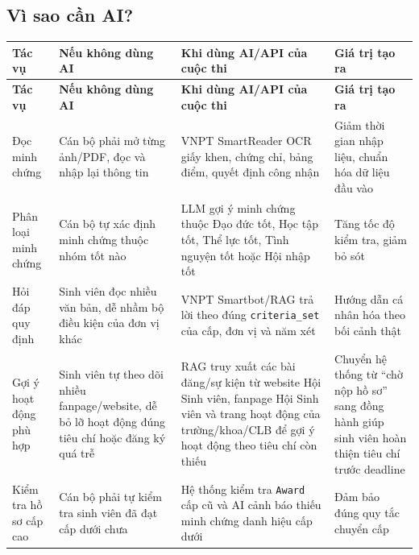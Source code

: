 \subsection{Vì sao cần AI?}

\begingroup
\footnotesize
\setlength{\tabcolsep}{3pt}
\renewcommand{\arraystretch}{1.25}

\begin{longtable}{|>{\raggedright\arraybackslash}p{}|
                  >{\raggedright\arraybackslash}p{}|
                  >{\raggedright\arraybackslash}p{}|
                  >{\raggedright\arraybackslash}p{}|}
\hline
\textbf{Tác vụ} &
\textbf{Nếu không dùng AI} &
\textbf{Khi dùng AI/API của cuộc thi} &
\textbf{Giá trị tạo ra} \\ \hline
\endfirsthead

\hline
\textbf{Tác vụ} &
\textbf{Nếu không dùng AI} &
\textbf{Khi dùng AI/API của cuộc thi} &
\textbf{Giá trị tạo ra} \\ \hline
\endhead

Đọc minh chứng &
Cán bộ phải mở từng ảnh/PDF, đọc và nhập lại thông tin &
VNPT SmartReader OCR giấy khen, chứng chỉ, bảng điểm, quyết định công nhận &
Giảm thời gian nhập liệu, chuẩn hóa dữ liệu đầu vào \\ \hline

Phân loại minh chứng &
Cán bộ tự xác định minh chứng thuộc nhóm tốt nào &
LLM gợi ý minh chứng thuộc Đạo đức tốt, Học tập tốt, Thể lực tốt, Tình nguyện tốt hoặc Hội nhập tốt &
Tăng tốc độ kiểm tra, giảm bỏ sót \\ \hline

Hỏi đáp quy định &
Sinh viên đọc nhiều văn bản, dễ nhầm bộ điều kiện của đơn vị khác &
VNPT Smartbot/RAG trả lời theo đúng \texttt{criteria\_set} của cấp, đơn vị và năm xét &
Hướng dẫn cá nhân hóa theo bối cảnh thật \\ \hline

Gợi ý hoạt động phù hợp &
Sinh viên tự theo dõi nhiều fanpage/website, dễ bỏ lỡ hoạt động đúng tiêu chí hoặc đăng ký quá trễ &
RAG truy xuất các bài đăng/sự kiện từ website Hội Sinh viên, fanpage Hội Sinh viên và trang hoạt động của trường/khoa/CLB để gợi ý hoạt động theo tiêu chí còn thiếu &
Chuyển hệ thống từ ``chờ nộp hồ sơ'' sang đồng hành giúp sinh viên hoàn thiện tiêu chí trước deadline \\ \hline

Kiểm tra hồ sơ cấp cao &
Cán bộ phải tự kiểm tra sinh viên đã đạt cấp dưới chưa &
Hệ thống kiểm tra \texttt{Award} cấp cũ và AI cảnh báo thiếu minh chứng danh hiệu cấp dưới &
Đảm bảo đúng quy tắc chuyển cấp \\ \hline


\end{longtable}
